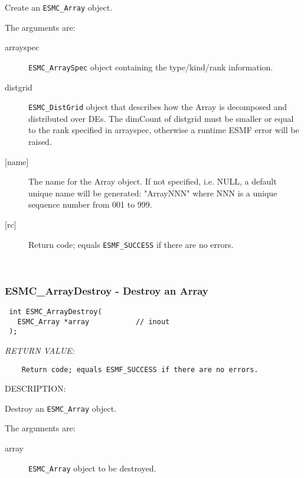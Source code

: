   
    Create an {\tt ESMC\_Array} object.
  
    The arguments are:
    \begin{description}
    \item[arrayspec]
      {\tt ESMC\_ArraySpec} object containing the type/kind/rank information.
    \item[distgrid]
      {\tt ESMC\_DistGrid} object that describes how the Array is decomposed and
      distributed over DEs. The dimCount of distgrid must be smaller or equal
      to the rank specified in arrayspec, otherwise a runtime ESMF error will be
      raised.
    \item[{[name]}]
      The name for the Array object. If not specified, i.e. NULL,
      a default unique name will be generated: "ArrayNNN" where NNN
      is a unique sequence number from 001 to 999.
    \item[{[rc]}]
      Return code; equals {\tt ESMF\_SUCCESS} if there are no errors.
    \end{description}
   
 
\mbox{}\hrulefill\ 
 
\subsubsection [ESMC\_ArrayDestroy] {ESMC\_ArrayDestroy - Destroy an Array}


  
\begin{verbatim} int ESMC_ArrayDestroy(
   ESMC_Array *array           // inout
 );\end{verbatim}{\em RETURN VALUE:}
\begin{verbatim}    Return code; equals ESMF_SUCCESS if there are no errors.\end{verbatim}
{\sf DESCRIPTION:\\ }


  
    Destroy an {\tt ESMC\_Array} object.
  
    The arguments are:
    \begin{description}
    \item[array] 
      {\tt ESMC\_Array} object to be destroyed.
    \end{description}
   
 
